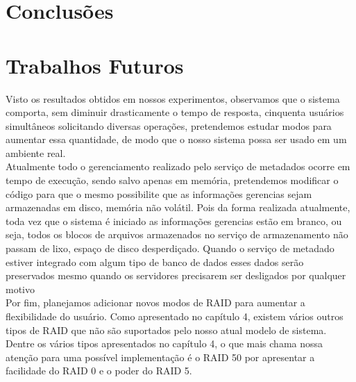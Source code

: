 \section{Conclusões}

\section{Trabalhos Futuros}
Visto os resultados obtidos em nossos experimentos, observamos que o sistema comporta, sem diminuir drasticamente o tempo de resposta, cinquenta usuários simultâneos  solicitando diversas operações, pretendemos estudar modos para aumentar essa quantidade, de modo que o nosso sistema possa ser usado em um ambiente real.
\\

Atualmente todo o gerenciamento realizado pelo serviço de metadados ocorre em tempo de execução, sendo salvo apenas em memória, pretendemos modificar o código para que o mesmo possibilite que as informações gerencias sejam armazenadas em disco, memória não volátil. Pois da forma realizada atualmente, toda vez que o sistema é iniciado as informações gerencias estão em branco, ou seja, todos os blocos de arquivos armazenados no serviço de armazenamento não passam de lixo, espaço de disco desperdiçado. Quando o serviço de metadado estiver integrado com algum tipo de banco de dados esses dados serão preservados mesmo quando os servidores precisarem ser desligados por qualquer motivo
\\

Por fim, planejamos adicionar novos modos de RAID para aumentar a flexibilidade do usuário. Como apresentado no capítulo 4, existem vários outros tipos de RAID que não são suportados pelo nosso atual modelo de sistema. Dentre os vários tipos apresentados no capítulo 4, o que mais chama nossa atenção para uma possível implementação é o RAID 50 por apresentar a facilidade do RAID 0 e o poder do RAID 5.
\\